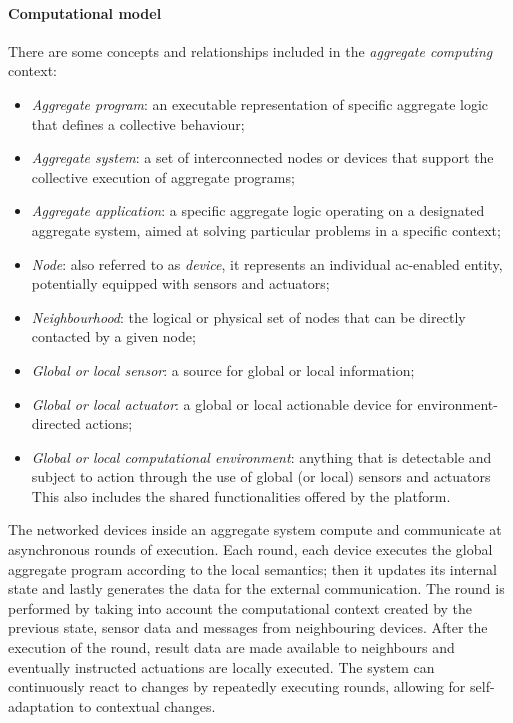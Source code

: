 \paragraph{Computational model}
There are some concepts and relationships included in the \emph{aggregate computing} context:
\begin{itemize}
    \item \emph{Aggregate program}: an executable representation of specific aggregate logic that defines a collective behaviour;
    \item \emph{Aggregate system}: a set of interconnected nodes or devices that support the collective execution of aggregate programs;
    \item \emph{Aggregate application}: a specific aggregate logic operating on a designated aggregate system, aimed at
        solving particular problems in a specific context;
    \item \emph{Node}: also referred to as \emph{device}, it represents an individual \ac{ac}-enabled entity, potentially
        equipped with sensors and actuators;
    \item \emph{Neighbourhood}: the logical or physical set of nodes that can be directly contacted by a given node;
    \item \emph{Global or local sensor}: a source for global or local information;
    \item \emph{Global or local actuator}: a global or local actionable device for environment-directed actions;
    \item \emph{Global or local computational environment}: anything that is detectable and subject to action through the
        use of global (or local) sensors and actuators
        This also includes the shared functionalities offered by the platform.
\end{itemize}

The networked devices inside an aggregate system compute and communicate at asynchronous rounds of execution.
Each round, each device executes the global aggregate program according to the local semantics; then it updates its internal
state and lastly generates the data for the external communication.
The round is performed by taking into account the computational context created by the previous state, sensor data and
messages from neighbouring devices.
After the execution of the round, result data are made available to neighbours and eventually instructed actuations are
locally executed.
The system can continuously react to changes by repeatedly executing rounds, allowing for self-adaptation to contextual changes.

